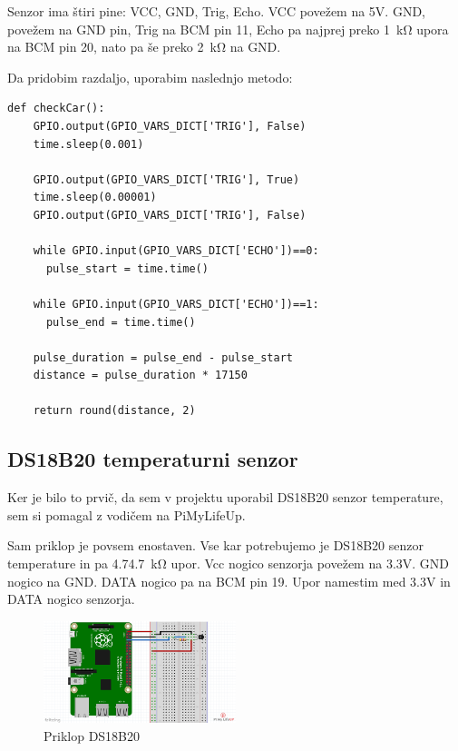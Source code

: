 \documentclass[11pt]{article}
\begin{document}
Senzor ima štiri pine: VCC, GND, Trig, Echo. VCC povežem na 5V. GND, povežem na GND pin, Trig na BCM pin 11, Echo pa najprej preko \SI{1}{\kohm} upora na BCM pin 20, nato pa še preko \SI{2}{\kohm} na GND.

Da pridobim razdaljo, uporabim naslednjo metodo:
\begin{verbatim}
def checkCar():  
    GPIO.output(GPIO_VARS_DICT['TRIG'], False)
    time.sleep(0.001)

    GPIO.output(GPIO_VARS_DICT['TRIG'], True)
    time.sleep(0.00001)
    GPIO.output(GPIO_VARS_DICT['TRIG'], False)

    while GPIO.input(GPIO_VARS_DICT['ECHO'])==0:
      pulse_start = time.time()

    while GPIO.input(GPIO_VARS_DICT['ECHO'])==1:
      pulse_end = time.time()

    pulse_duration = pulse_end - pulse_start
    distance = pulse_duration * 17150

    return round(distance, 2)
\end{verbatim}

\subsection{DS18B20 temperaturni senzor}
Ker je bilo to prvič, da sem v projektu uporabil DS18B20 senzor temperature, sem si pomagal z vodičem na PiMyLifeUp\cite{PiMyLifeUp_DS18B20}.

Sam priklop je povsem enostaven. Vse kar potrebujemo je DS18B20 senzor temperature in pa 4.7\SI{4.7}{\kohm} upor. Vcc nogico senzorja povežem na 3.3V. GND nogico na GND. DATA nogico pa na BCM pin 19. Upor namestim med 3.3V in DATA nogico senzorja.
\begin{figure}[h]
\centering
\includegraphics[width=0.5\textwidth]{images/DS18B20_diagram.png}
\caption{Priklop DS18B20}
\end{figure}
\newpage
\end{document}
